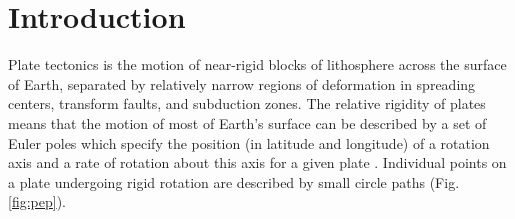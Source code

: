 \documentclass[11pt,letterpaper]{article}
\begin{document}

\section*{Introduction}

Plate tectonics is the motion of near-rigid blocks of lithosphere across the surface of Earth, separated by relatively narrow regions of deformation in spreading centers, transform faults, and subduction zones. The relative rigidity of plates means that the motion of most of Earth's surface can be described by a set of Euler poles which specify the position (in latitude and longitude) of a rotation axis and a rate of rotation about this axis for a given plate \citep[cf.][]{Cox2009a}. Individual points on a plate undergoing rigid rotation are described by small circle paths (Fig. \ref{fig:pep}).
\end{document}
